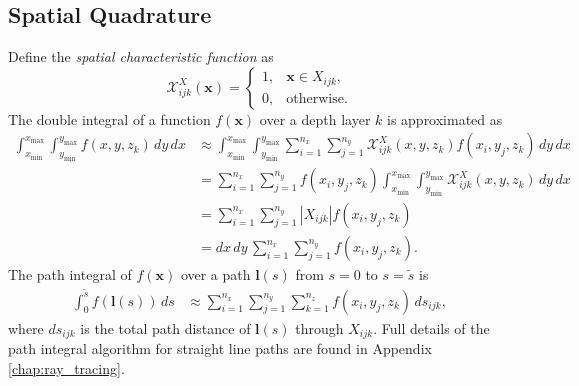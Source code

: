 \documentclass[ms,cpyr,lof,lot]{uathesis}
\newcommand\xmin{{x_{\min}}}
\newcommand\xmax{{x_{\max}}}
\newcommand\ymin{{y_{\min}}}
\newcommand\ymax{{y_{\max}}}
\newcommand\abs[1]{\left| #1 \right|}
\renewcommand\vec\bm
\begin{document}
\subsection{Spatial Quadrature}
Define the \textit{spatial characteristic function} as
\begin{equation*}
  \mathcal{X}^X_{ijk}(\vec{x}) = \begin{cases}
    1, & \vec{x} \in X_{ijk}, \\
    0, & \mbox{otherwise}.
  \end{cases}
\end{equation*}
The double integral of a function $f(\vec{x})$ over a depth layer $k$ is approximated as
\begin{align*}
  \int_\xmin^\xmax\int_\ymin^\ymax f(x, y, z_k)\, dy\, dx &\approx \int_\xmin^\xmax \int_\ymin^\ymax \sum_{i=1}^{n_x}\sum_{j=1}^{n_y} \mathcal{X}^X_{ijk}(x,y,z_k) f(x_i, y_j, z_k)\, dy\, dx \\
  &= \sum_{i=1}^{n_x}\sum_{j=1}^{n_y} f(x_i, y_j, z_k) \int_\xmin^\xmax \int_\ymin^\ymax \mathcal{X}^X_{ijk}(x,y,z_k) \, dy\, dx \\
  &= \sum_{i=1}^{n_x}\sum_{j=1}^{n_y} \abs{X_{ijk}} f(x_i, y_j, z_k) \\
  &= dx\, dy\, \sum_{i=1}^{n_x}\sum_{j=1}^{n_y} f(x_i, y_j, z_k).
\end{align*}
The path integral of $f(\vec{x})$ over a path $\vec{l}(s)$ from $s=0$ to $s=\tilde{s}$ is
\begin{align*}
  \int_0^{\tilde{s}} f(\vec{l}(s))\, ds &\approx \sum_{i=1}^{n_x}\sum_{j=1}^{n_y}\sum_{k=1}^{n_z} f(x_i, y_j, z_k)\, ds_{ijk},
\end{align*}
where $ds_{ijk}$ is the total path distance of $\vec{l}(s)$ through $X_{ijk}$.
Full details of the path integral algorithm for straight line paths are found in Appendix \ref{chap:ray_tracing}.
\end{document}
